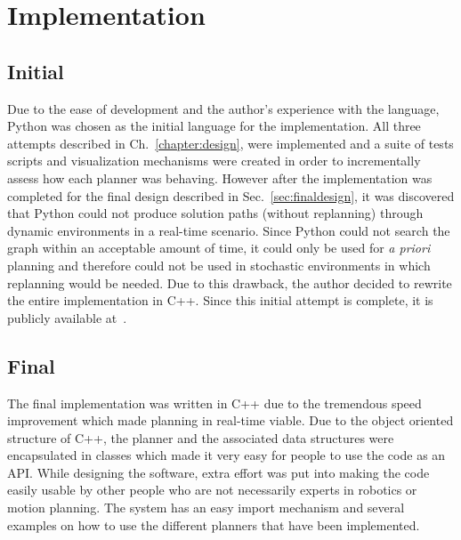 


\chapter{Implementation}

\label{chapter:Implementation}

\section{Initial}

Due to the ease of development and the author's experience with the language,
Python was chosen as the initial language for the implementation. All three
attempts described in Ch.~\ref{chapter:design}, were implemented and a suite of
tests scripts and visualization mechanisms were created in order to
incrementally assess how each planner was behaving. However after the
implementation was completed for the final design described in
Sec.~\ref{sec:finaldesign}, it was discovered that Python could not produce
solution paths (without replanning) through dynamic environments in a real-time
scenario. Since Python could not search the graph within an acceptable amount
of time, it could only be used for \emph{a priori} planning and therefore could
not be used in stochastic environments in which replanning would be needed. Due
to this drawback, the author decided to rewrite the entire implementation in
C++.  Since this initial attempt is complete, it is publicly available
at~\cite{racer}.

\section{Final}

The final implementation was written in C++ due to the tremendous speed
improvement which made planning in real-time viable. Due to the object oriented
structure of C++, the planner and the associated data structures were
encapsulated in classes which made it very easy for people to use the code as
an API. While designing the software, extra effort was put into making the code
easily usable by other people who are not necessarily experts in robotics or
motion planning.  The system has an easy import mechanism and several examples
on how to use the different planners that have been implemented.

